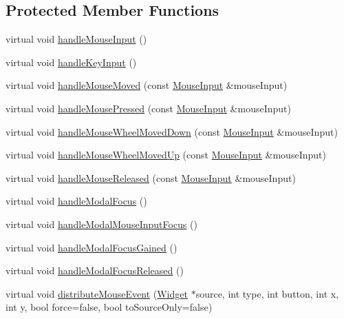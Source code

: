 \subsection*{Protected Member Functions}
\begin{DoxyCompactItemize}
\item 
virtual void \hyperlink{classgcn_1_1Gui_a1208b3a8e98f54890864e020db204d82}{handle\+Mouse\+Input} ()
\item 
virtual void \hyperlink{classgcn_1_1Gui_a9ccdd4c90d5909c6a79d9e421aef0772}{handle\+Key\+Input} ()
\item 
virtual void \hyperlink{classgcn_1_1Gui_adc19660c008400343a35c47307861192}{handle\+Mouse\+Moved} (const \hyperlink{classgcn_1_1MouseInput}{Mouse\+Input} \&mouse\+Input)
\item 
virtual void \hyperlink{classgcn_1_1Gui_a24cf9a608ac21b734ef5e9d5a3a36b31}{handle\+Mouse\+Pressed} (const \hyperlink{classgcn_1_1MouseInput}{Mouse\+Input} \&mouse\+Input)
\item 
virtual void \hyperlink{classgcn_1_1Gui_ac0d9aa81a137206e6d73604994523842}{handle\+Mouse\+Wheel\+Moved\+Down} (const \hyperlink{classgcn_1_1MouseInput}{Mouse\+Input} \&mouse\+Input)
\item 
virtual void \hyperlink{classgcn_1_1Gui_a949c5513a73f39f94efecb84cd4d02d6}{handle\+Mouse\+Wheel\+Moved\+Up} (const \hyperlink{classgcn_1_1MouseInput}{Mouse\+Input} \&mouse\+Input)
\item 
virtual void \hyperlink{classgcn_1_1Gui_a2516448db507647152d97d8b600d2203}{handle\+Mouse\+Released} (const \hyperlink{classgcn_1_1MouseInput}{Mouse\+Input} \&mouse\+Input)
\item 
virtual void \hyperlink{classgcn_1_1Gui_a762a5583087900e1414091d3a3f3f18b}{handle\+Modal\+Focus} ()
\item 
virtual void \hyperlink{classgcn_1_1Gui_a9f85d69ebed46ca9d8441ac93cbbc1ec}{handle\+Modal\+Mouse\+Input\+Focus} ()
\item 
virtual void \hyperlink{classgcn_1_1Gui_a89afef358be49be921161f7c9d818976}{handle\+Modal\+Focus\+Gained} ()
\item 
virtual void \hyperlink{classgcn_1_1Gui_a4841624147d75ceccd080e2c98a3ff3e}{handle\+Modal\+Focus\+Released} ()
\item 
virtual void \hyperlink{classgcn_1_1Gui_a5aca2b2c0e168d5be705578b41bb2989}{distribute\+Mouse\+Event} (\hyperlink{classgcn_1_1Widget}{Widget} $\ast$source, int type, int button, int x, int y, bool force=false, bool to\+Source\+Only=false)
\item 

\end{DoxyCompactItemize}
